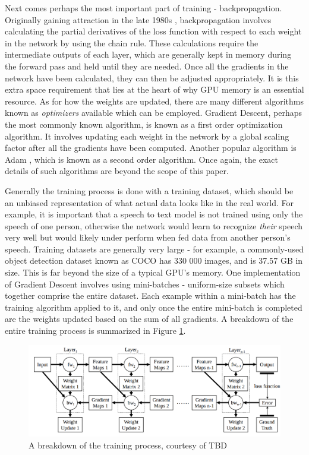 \documentclass[12pt,letterpaper]{article}
\begin{document}
Next comes perhaps the most important part of training - backpropagation. Originally gaining attraction in the late 1980s \cite{hinton_backpropagation}, backpropagation involves calculating the partial derivatives of the loss function with respect to each weight in the network by using the chain rule. These calculations require the intermediate outputs of each layer, which are generally kept in memory during the forward pass and held until they are needed. Once all the gradients in the network have been calculated, they can then be adjusted appropriately. It is this extra space requirement that lies at the heart of why GPU memory is an essential resource. As for how the weights are updated, there are many different algorithms known as \textit{optimizers} available \cite{optimizers} which can be employed. Gradient Descent, perhaps the most commonly known algorithm, is known as a first order optimization algorithm. It involves updating each weight in the network by a global scaling factor after all the gradients have been computed. Another popular algorithm is Adam \cite{adam}, which is known as a second order algorithm. Once again, the exact details of such algorithms are beyond the scope of this paper.
\par

Generally the training process is done with a training dataset, which should be an unbiased representation of what actual data looks like in the real world. For example, it is important that a speech to text model is not trained using only the speech of one person, otherwise the network would learn to recognize \textit{their} speech very well but would likely under perform when fed data from another person's speech. Training datasets are generally very large - for example, a commonly-used object detection dataset known as COCO \cite{COCO} has 330 000 images, and is 37.57 GB in size. This is far beyond the size of a typical GPU's memory. One implementation of Gradient Descent involves using mini-batches - uniform-size subsets which together comprise the entire dataset. Each example within a mini-batch has the training algorithm applied to it, and only once the entire mini-batch is completed are the weights updated based on the sum of all gradients. A breakdown of the entire training process is summarized in Figure \ref{fig:training_memory_breakdown}.
\par

\begin{figure}[ht]
\centering
\includegraphics[width=1\textwidth]{training_memory_breakdown.png}
\captionsetup{width=0.7\linewidth}
\caption{A breakdown of the training process, courtesy of TBD \cite{tbd}}
\label{fig:training_memory_breakdown}
\end{figure}
\end{document}
